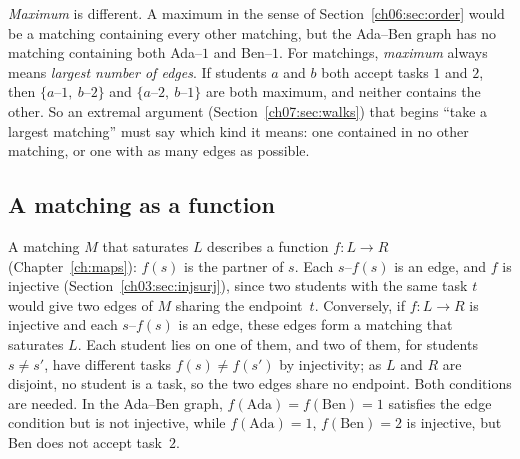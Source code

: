 \emph{Maximum} is different. A maximum in the sense of Section~\ref{ch06:sec:order} would be a matching containing every other matching, but the Ada--Ben graph has no matching containing both Ada--$1$ and Ben--$1$. For matchings, \emph{maximum} always means \emph{largest number of edges}. If students $a$ and $b$ both accept tasks $1$ and $2$, then $\{a\text{--}1,\ b\text{--}2\}$ and $\{a\text{--}2,\ b\text{--}1\}$ are both maximum, and neither contains the other. So an extremal argument (Section~\ref{ch07:sec:walks}) that begins ``take a largest matching'' must say which kind it means: one contained in no other matching, or one with as many edges as possible.

\subsection*{A matching as a function}
A matching $M$ that saturates $L$ describes a function $f:L\to R$ (Chapter~\ref{ch:maps}): $f(s)$ is the partner of $s$. Each $s$--$f(s)$ is an edge, and $f$ is injective (Section~\ref{ch03:sec:injsurj}), since two students with the same task $t$ would give two edges of $M$ sharing the endpoint~$t$. Conversely, if $f:L\to R$ is injective and each $s$--$f(s)$ is an edge, these edges form a matching that saturates $L$. Each student lies on one of them, and two of them, for students $s\ne s'$, have different tasks $f(s)\ne f(s')$ by injectivity; as $L$ and $R$ are disjoint, no student is a task, so the two edges share no endpoint. Both conditions are needed. In the Ada--Ben graph, $f(\text{Ada})=f(\text{Ben})=1$ satisfies the edge condition but is not injective, while $f(\text{Ada})=1$, $f(\text{Ben})=2$ is injective, but Ben does not accept task~$2$.

